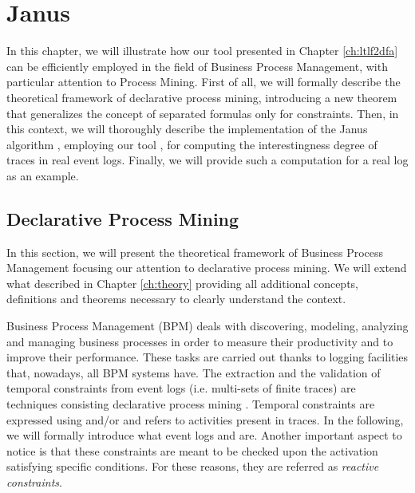 \chapter{Janus}
In this chapter, we will illustrate how our tool \LTLfToDFA presented in Chapter \ref{ch:ltlf2dfa} can be efficiently employed in the field of Business Process Management, with particular attention to Process Mining. First of all, we will formally describe the theoretical framework of declarative process mining, introducing a new theorem that generalizes the concept of separated formulas only for \declare constraints. Then, in this context, we will thoroughly describe the implementation of the Janus algorithm \citep{cecconi2018interestingness}, employing our tool \LTLfToDFA, for computing the interestingness degree of traces in real event logs. Finally, we will provide such a computation for a real log as an example. 
\section{Declarative Process Mining}
In this section, we will present the theoretical framework of Business Process Management focusing our attention to declarative process mining. We will extend what described in Chapter \ref{ch:theory} providing all additional concepts, definitions and theorems necessary to clearly understand the context.

Business Process Management (BPM) deals with discovering, modeling, analyzing and managing business processes in order to measure their productivity and to improve their performance. These tasks are carried out thanks to logging facilities that, nowadays, all BPM systems have. The extraction and the validation of temporal constraints from event logs (i.e. multi-sets of finite traces) are techniques consisting declarative process mining \citep{montali2010declarative}. Temporal constraints are expressed using \LTLf and/or \PLTL and refers to activities present in traces. In the following, we will formally introduce what event logs and \declare \citep{pesic2008constraint} are. Another important aspect to notice is that these constraints are meant to be checked upon the activation satisfying specific conditions. For these reasons, they are referred as \emph{reactive constraints}.
